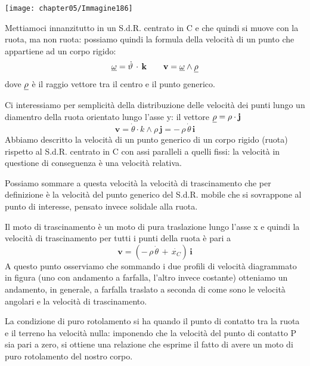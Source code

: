 \begin{minipage}{.25\textwidth}
\centering
\texttt{[image: chapter05/Immagine186]}
\end{minipage}
\hfill
\begin{minipage}{.75\textwidth}
Mettiamoci innanzitutto in un S.d.R. centrato in C e che quindi si muove con la ruota, ma non ruota: possiamo quindi la formula della velocità di un punto che appartiene ad un corpo rigido:
\[\underline{\omega} = \dot{\vartheta}\,\cdot\,\mathbf{k}\qquad\mathbf{v} = \underline{\omega}\wedge\underline{\rho}\]
dove $\underline{\rho}$ è il raggio vettore tra il centro e il punto generico.

Ci interessiamo per semplicità della distribuzione delle velocità dei punti lungo un diamentro della ruota orientato lungo l'asse y: il vettore $\underline{\rho} = \rho\cdot\mathbf{j}$
\[\mathbf{v} = \dot{\theta}\cdot{k}\wedge\rho\,\mathbf{j} = -\,\rho\,\dot{\theta}\,\mathbf{i}\]
Abbiamo descritto la velocità di un punto generico di un corpo rigido (ruota) rispetto al S.d.R. centrato in C con assi paralleli a quelli fissi: la velocità in questione di conseguenza è una velocità relativa.

Possiamo sommare a questa velocità la velocità di trascinamento che per definizione è la velocità del punto generico del S.d.R. mobile che si sovrappone al punto di interesse, pensato invece solidale alla ruota.
\end{minipage}
\vspace{1mm}

Il moto di trascinamento è un moto di pura traslazione lungo l'asse x e quindi la velocità di trascinamento per tutti i punti della ruota è pari a
\[\mathbf{v} = (-\,\rho\,\dot{\theta}\,+\,\dot{x_C})\,\mathbf{i}\]
A questo punto osserviamo che sommando i due profili di velocità diagrammato in figura (uno con andamento a farfalla, l'altro invece costante) otteniamo un andamento, in generale, a farfalla traslato a seconda di come sono le velocità angolari e la velocità di trascinamento.

La condizione di puro rotolamento si ha quando il punto di contatto tra la ruota e il terreno ha velocità nulla: imponendo che la velocità del punto di contatto P sia pari a zero, si ottiene una relazione che esprime il fatto di avere un moto di puro rotolamento del nostro corpo.

